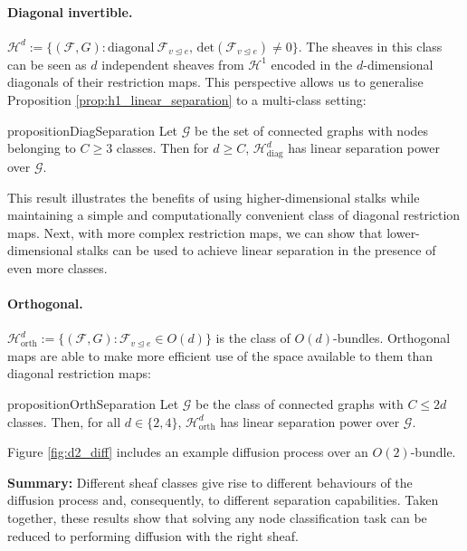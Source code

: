 \documentclass{article}
\def\gF{{\mathcal{F}}}
\def\gG{{\mathcal{G}}}
\def\gH{{\mathcal{H}}}
\newcommand{\tleq}{\trianglelefteq}
\begin{document}
\paragraph*{Diagonal invertible.}
$\gH^d := \{ (\gF, G) : \mathrm{diagonal\ } \gF_{v \tleq e}, \, \mathrm{det}(\gF_{v \tleq e}) \neq 0\}$. 
The sheaves in this class can be seen as $d$ independent sheaves from $\gH^1$ encoded in the $d$-dimensional diagonals of their restriction maps. This perspective allows us to generalise Proposition \ref{prop:h1_linear_separation} to a multi-class setting: 
\begin{restatable}{proposition}{DiagSeparation}\label{prop:diag_separation}
Let $\gG$ be the set of connected graphs with nodes belonging to $C \geq 3$ classes. Then for $d \geq C$, $\gH_{\mathrm{diag}}^d$ has linear separation power over $\gG$.  
\end{restatable}
This result illustrates the benefits of using higher-dimensional stalks while maintaining a simple and computationally convenient class of diagonal restriction maps. Next, with more complex restriction maps, we can show that lower-dimensional stalks can be used to achieve linear separation in the presence of even more classes. 

\paragraph*{Orthogonal.}

$\gH_{\mathrm{orth}}^d := \{ (\gF, G) : \gF_{v \tleq e} \in O(d)\} \nonumber$ is the class of $O(d)$-bundles. 
Orthogonal maps are able to make more efficient use of the space available to them than diagonal restriction maps: 

\begin{restatable}{proposition}{OrthSeparation}\label{theo:orth_separation}
Let $\gG$ be the class of connected graphs with $C \leq 2d$ classes. Then, for all $d \in \{2, 4\}$, $\gH_{\mathrm{orth}}^{d}$ has linear separation power over $\gG$.  
\end{restatable}

Figure \ref{fig:d2_diff} includes an example diffusion process over an $O(2)$-bundle. 


\begin{tcolorbox}[boxsep=0mm,left=2.5mm,right=2.5mm]
\textbf{Summary:} Different sheaf classes give rise to different behaviours of the diffusion process and, consequently, to different separation capabilities. Taken together, these results show that solving any node classification task can be reduced to performing diffusion with the right sheaf.    
\end{tcolorbox}
\vspace{-5pt}
\end{document}
